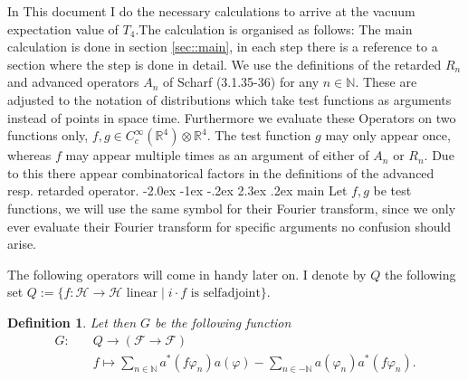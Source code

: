 \documentclass[oneside,reqno,12pt]{amsart}
\makeatletter
\newtheorem{Def}{Definition}[section]
\renewcommand\section{\@startsection {section}{1}{\z@}%
                                   {-2.0ex \@plus -1ex \@minus -.2ex}%
                                   {2.3ex \@plus.2ex}%
                                   {\normalfont\Large\bfseries}}
\makeatother
\begin{document}
In This document I do the necessary calculations to arrive at the vacuum expectation value of \(T_4\).The calculation is organised as follows: The main calculation is done in section \ref{sec::main}, in each step there is a reference to a section where the step is done in detail.
We use the definitions of the retarded \(R_n\) and advanced operators \(A_n\) of Scharf (3.1.35-36) for any \(n\in\mathbb{N}\). These are adjusted to the notation of distributions which take test functions as arguments instead of points in space time. Furthermore we evaluate these Operators on two functions only, \(f,g\in C_c^\infty \left(\mathbb{R}^4\right)\otimes \mathbb{R}^4\). The test function \(g\) may only appear once, whereas \(f\) may appear multiple times as an argument of either of \(A_n\) or \(R_n\). Due to this there appear combinatorical factors in the definitions of the advanced resp. retarded operator. 
\section{main}\label{sec::main}
Let \(f,g\) be test functions, we will use the same symbol for their Fourier transform, since we only ever evaluate their Fourier transform for specific arguments no confusion should arise. 

The following operators will come in handy later on.
I denote by \(Q\) the following set \(Q:=\{f: \mathcal{H}\rightarrow \mathcal{H} \text{ linear} \mid i \cdot f \text{ is selfadjoint}\}\).
\begin{Def}
 Let then \(G\) be the following function
\begin{align*}\tag{Def G} \label{Def G}
G: \quad & Q\rightarrow \left( \mathcal{F}\rightarrow \mathcal{F} \right)\\
& f\mapsto \sum_{n\in\mathbb{N}}a^*(f \varphi_n) a(\varphi) - \sum_{n\in -\mathbb{N}} a(\varphi_n) a^*(f \varphi_n).
\end{align*}
\end{Def}
\end{document}

